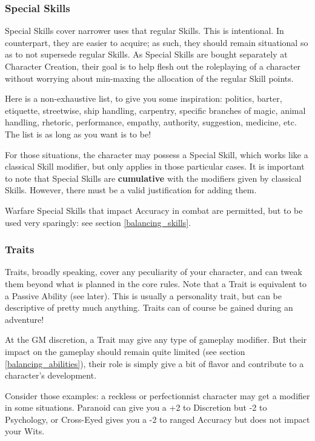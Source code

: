 \subsubsection{Special Skills}

Special Skills cover narrower uses that regular Skills. This is intentional. In counterpart, they are easier to acquire; as such, they should remain situational so as to not supersede regular Skills. As Special Skills are bought separately at Character Creation, their goal is to help flesh out the roleplaying of a character without worrying about min-maxing the allocation of the regular Skill points.

Here is a non-exhaustive list, to give you some inspiration: politics, barter, etiquette, streetwise, ship handling, carpentry, specific branches of magic, animal handling, rhetoric, performance, empathy, authority, suggestion, medicine, etc. The list is as long as you want is to be!

For those situations, the character may possess a Special Skill, which works like a classical Skill modifier, but only applies in those particular cases. It is important to note that Special Skills are \textbf{cumulative} with the modifiers given by classical Skills. However, there must be a valid justification for adding them.

Warfare Special Skills that impact Accuracy in combat are permitted, but to be used very sparingly: see section \ref{balancing_skills}.


\subsubsection{Traits}

Traits, broadly speaking, cover any peculiarity of your character, and can tweak them beyond what is planned in the core rules. Note that a Trait is equivalent to a Passive Ability (see later). This is usually a personality trait, but can be descriptive of pretty much anything. Traits can of course be gained during an adventure!

At the GM discretion, a Trait may give any type of gameplay modifier. But their impact on the gameplay should remain quite limited (see section \ref{balancing_abilities}), their role is simply give a bit of flavor and contribute to a character's development. 

Consider those examples: a reckless or perfectionnist character may get a modifier in some situations. Paranoid can give you a +2 to Discretion but -2 to Psychology, or Cross-Eyed gives you a -2 to ranged Accuracy but does not impact your Wits. 

